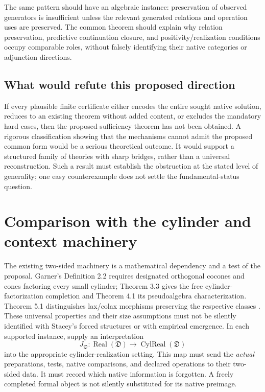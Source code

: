 \documentclass[11pt]{article}
\theoremstyle{remark}
\newcommand{\Real}{\operatorname{Real}}
\begin{document}
The same pattern should have an algebraic instance: preservation of observed generators is insufficient unless the relevant generated relations and operation uses are preserved. The common theorem should explain why relation preservation, predictive continuation closure, and positivity/realization conditions occupy comparable roles, without falsely identifying their native categories or adjunction directions.

\subsection{What would refute this proposed direction}

If every plausible finite certificate either encodes the entire sought native solution, reduces to an existing theorem without added content, or excludes the mandatory hard cases, then the proposed sufficiency theorem has not been obtained. A rigorous classification showing that the mechanisms cannot admit the proposed common form would be a serious theoretical outcome. It would support a structured family of theories with sharp bridges, rather than a universal reconstruction. Such a result must establish the obstruction at the stated level of generality; one easy counterexample does not settle the fundamental-status question.

\section{Comparison with the cylinder and context machinery}
\label{sec:cylinders}

The existing two-sided machinery is a mathematical dependency and a test of the proposal. Garner's Definition 2.2 requires designated orthogonal cocones and cones factoring every small cylinder; Theorem 3.3 gives the free cylinder-factorization completion and Theorem 4.1 its pseudoalgebra characterization. Theorem 5.1 distinguishes lax/colax morphisms preserving the respective classes \cite{Garner}. These universal properties and their size assumptions must not be silently identified with Stacey's forced structures or with empirical emergence. In each supported instance, supply an interpretation
\[
 J_{\mathfrak D}:\Real(\mathfrak D)\longrightarrow\operatorname{CylReal}(\mathfrak D)
\]
into the appropriate cylinder-realization setting. This map must send the \emph{actual} preparations, tests, native comparisons, and declared operations to their two-sided data. It must record which native information is forgotten. A freely completed formal object is not silently substituted for its native preimage.
\end{document}
